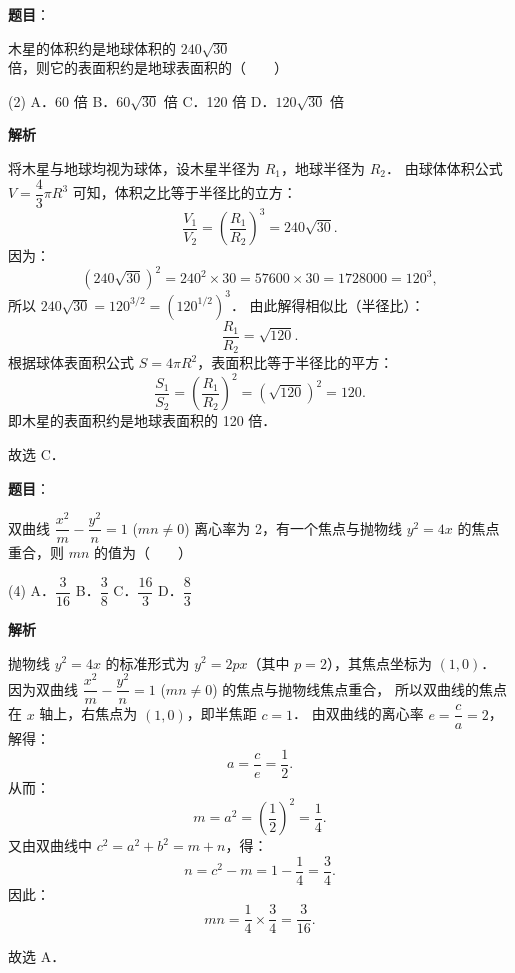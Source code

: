 \begin{answer}

\textbf{题目}：

木星的体积约是地球体积的 $240\sqrt{30}$ 倍，则它的表面积约是地球表面积的\mbox{（　　）}

\begin{gkopts}(2)
\task A．60 倍
\task B．$60\sqrt{30}$ 倍
\task C．120 倍
\task D．$120\sqrt{30}$ 倍
\end{gkopts}

\textbf{解析}

将木星与地球均视为球体，设木星半径为 $R_1$，地球半径为 $R_2$．
由球体体积公式 $V = \dfrac{4}{3}\pi R^3$ 可知，体积之比等于半径比的立方：
\nopagebreak[4]
\[
\frac{V_1}{V_2} = \left(\frac{R_1}{R_2}\right)^3 = 240\sqrt{30}.
\]
因为：
\nopagebreak[4]
\[
(240\sqrt{30})^2 = 240^2 \times 30 = 57600 \times 30 = 1728000 = 120^3,
\]
所以 $240\sqrt{30} = 120^{3/2} = (120^{1/2})^3$．
由此解得相似比（半径比）：
\nopagebreak[4]
\[
\frac{R_1}{R_2} = \sqrt{120}.
\]
根据球体表面积公式 $S = 4\pi R^2$，表面积比等于半径比的平方：
\nopagebreak[4]
\[
\frac{S_1}{S_2} = \left(\frac{R_1}{R_2}\right)^2 = (\sqrt{120})^2 = 120.
\]
即木星的表面积约是地球表面积的 120 倍．

故选 C．


\end{answer}
\begin{answer}

\textbf{题目}：

双曲线 $\dfrac{x^2}{m} - \dfrac{y^2}{n} = 1$ ($mn \neq 0$) 离心率为 2，有一个焦点与抛物线 $y^2 = 4x$ 的焦点重合，则 $mn$ 的值为\mbox{（　　）}

\begin{gkopts}(4)
\task A．$\dfrac{3}{16}$
\task B．$\dfrac{3}{8}$
\task C．$\dfrac{16}{3}$
\task D．$\dfrac{8}{3}$
\end{gkopts}

\textbf{解析}

抛物线 $y^2 = 4x$ 的标准形式为 $y^2 = 2px$（其中 $p = 2$），其焦点坐标为 $(1, 0)$．
因为双曲线 $\dfrac{x^2}{m} - \dfrac{y^2}{n} = 1$ ($mn \neq 0$) 的焦点与抛物线焦点重合，
所以双曲线的焦点在 $x$ 轴上，右焦点为 $(1, 0)$，即半焦距 $c = 1$．
由双曲线的离心率 $e = \dfrac{c}{a} = 2$，解得：
\nopagebreak[4]
\[
a = \frac{c}{e} = \frac{1}{2}.
\]
从而：
\nopagebreak[4]
\[
m = a^2 = \left(\frac{1}{2}\right)^2 = \frac{1}{4}.
\]
又由双曲线中 $c^2 = a^2 + b^2 = m + n$，得：
\nopagebreak[4]
\[
n = c^2 - m = 1 - \frac{1}{4} = \frac{3}{4}.
\]
因此：
\nopagebreak[4]
\[
mn = \frac{1}{4} \times \frac{3}{4} = \frac{3}{16}.
\]

故选 A．


\end{answer}
